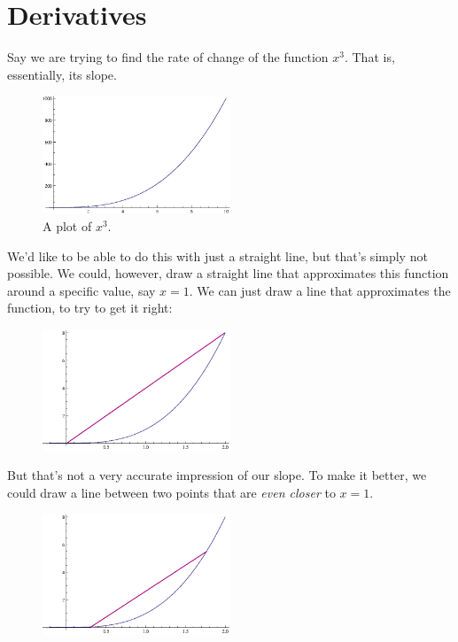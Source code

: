 \chapter{Derivatives}\label{ch:derivatives}

Say we are trying to find the rate of change of the function $x^3$.
That is, essentially, its slope.
\begin{figure}[H]
  \begin{center}
    \includegraphics[width=0.5\textwidth]{continuous/derivatives/x3.eps}
  \end{center}
  \caption{A plot of $x^3$.}
\end{figure}
We'd like to be able to do this with just a straight line, but that's simply not possible.
We could, however, draw a straight line that approximates this function around a specific value, say $x=1$.
We can just draw a line that approximates the function, to try to get it right:
\begin{figure}[H]
  \begin{center}
    \includegraphics[width=0.5\textwidth]{continuous/derivatives/x3_1.eps}
  \end{center}
\end{figure}
But that's not a very accurate impression of our slope.
To make it better, we could draw a line between two points that are \emph{even closer} to $x=1$.
\begin{figure}[H]
  \begin{center}
    \includegraphics[width=0.5\textwidth]{continuous/derivatives/x3_2.eps}
  \end{center}
\end{figure}
